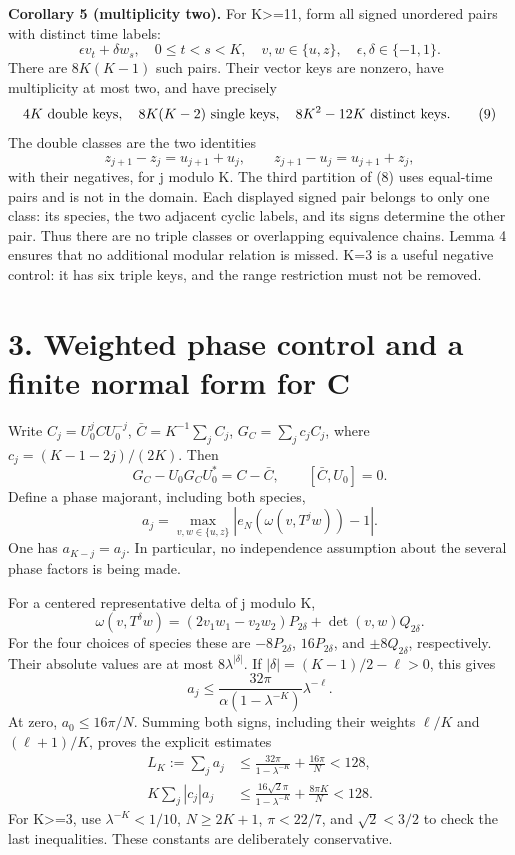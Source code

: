 \documentclass[11pt,a4paper]{article}
\begin{document}
\textbf{Corollary 5 (multiplicity two).} For K\textgreater=11, form all signed unordered pairs with distinct time labels: \[
 \epsilon v_t+\delta w_s,
 \quad 0\leq t<s<K,\quad v,w\in\{u,z\},\quad
 \epsilon,\delta\in\{-1,1\}.
\] There are \(8K(K-1)\) such pairs. Their vector keys are nonzero, have multiplicity at most two, and have precisely \[
 4K\ \hbox{double keys},\quad 8K(K-2)\ \hbox{single keys},
 \quad 8K^2-12K\ \hbox{distinct keys}.                          \tag{9}
\] The double classes are the two identities \[
 z_{j+1}-z_j=u_{j+1}+u_j,\qquad
 z_{j+1}-u_j=u_{j+1}+z_j,
\] with their negatives, for j modulo K. The third partition of (8) uses equal-time pairs and is not in the domain. Each displayed signed pair belongs to only one class: its species, the two adjacent cyclic labels, and its signs determine the other pair. Thus there are no triple classes or overlapping equivalence chains. Lemma 4 ensures that no additional modular relation is missed. K=3 is a useful negative control: it has six triple keys, and the range restriction must not be removed.

\hypertarget{weighted-phase-control-and-a-finite-normal-form-for-c}{%
\section{3. Weighted phase control and a finite normal form for C}\label{weighted-phase-control-and-a-finite-normal-form-for-c}}

Write \(C_j=U_0^jCU_0^{-j}\), \(\bar C=K^{-1}\sum_j C_j\), \(G_C=\sum_j c_jC_j\), where \(c_j=(K-1-2j)/(2K)\). Then \[
 G_C-U_0G_CU_0^*=C-\bar C,\qquad [\bar C,U_0]=0.                \tag{10}
\] Define a phase majorant, including both species, \[
 a_j=\max_{v,w\in\{u,z\}}
          |e_N(\omega(v,T^jw))-1|.
\] One has \(a_{K-j}=a_j\). In particular, no independence assumption about the several phase factors is being made.

For a centered representative delta of j modulo K, \[
 \omega(v,T^\delta w)
 =(2v_1w_1-v_2w_2)P_{2\delta}+\det(v,w)Q_{2\delta}.
\] For the four choices of species these are \(-8P_{2\delta}\), \(16P_{2\delta}\), and \(\pm8Q_{2\delta}\), respectively. Their absolute values are at most \(8\lambda^{|\delta|}\). If \(|\delta|=(K-1)/2-\ell>0\), this gives \[
 a_j\leq\frac{32\pi}{\alpha(1-\lambda^{-K})}\lambda^{-\ell}.
\] At zero, \(a_0\leq16\pi/N\). Summing both signs, including their weights \(\ell/K\) and \((\ell+1)/K\), proves the explicit estimates \[
 \begin{split}
 L_K:=\sum_j a_j
   &\leq\frac{32\pi}{1-\lambda^{-K}}+\frac{16\pi}{N}<128,\\
 K\sum_j|c_j|a_j
   &\leq\frac{16\sqrt2\pi}{1-\lambda^{-K}}+
                                      \frac{8\pi K}{N}<128.
 \end{split}                                                    \tag{11}
\] For K\textgreater=3, use \(\lambda^{-K}<1/10\), \(N\geq2K+1\), \(\pi<22/7\), and \(\sqrt2<3/2\) to check the last inequalities. These constants are deliberately conservative.
\end{document}
